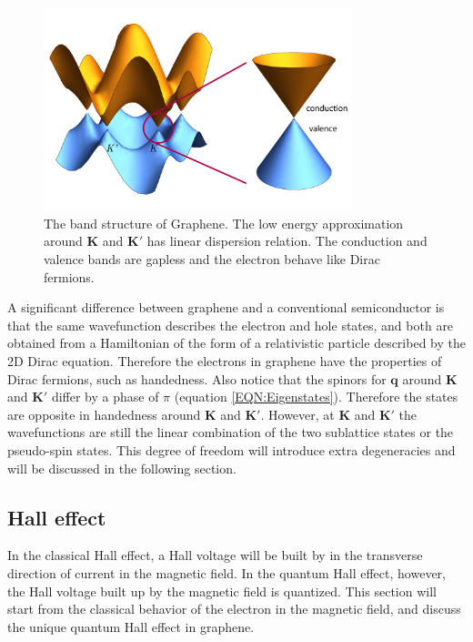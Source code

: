\documentclass[pdflatex, sectionletters, 12pt, final, phd]{pittetd}    %
\begin{document}
\begin{figure}[h!]
	\centering
	\includegraphics[width=0.8\textwidth]{Drawing/GrapheneBandStructure_zoomin.png}
	\caption[The band structure of Graphene]{The band structure of Graphene. The low energy approximation around $\mathbf{K}$ and $\mathbf{K'}$ has linear dispersion relation. The conduction and valence bands are gapless and the electron behave like Dirac fermions.}
	\label{FIG:GrapheneBand}
\end{figure}

A significant difference between graphene and a conventional semiconductor is that the same wavefunction describes the electron and hole states, and both are obtained from a Hamiltonian of the form of a relativistic particle described by the 2D Dirac equation\cite{neto2009electronic}. Therefore the electrons in graphene have the properties of Dirac fermions, such as handedness. Also notice that the spinors for $\mathbf{q}$ around $\mathbf{K}$ and $\mathbf{K'}$ differ by a phase of $\pi$ (equation \ref{EQN:Eigenstates}). Therefore the states are opposite in handedness around $\mathbf{K}$ and $\mathbf{K'}$. However, at $\mathbf{K}$ and $\mathbf{K'}$ the wavefunctions are still the linear combination of the two sublattice states or the pseudo-spin states. This degree of freedom will introduce extra degeneracies and will be discussed in the following section.

\subsection{Hall effect}

In the classical Hall effect, a Hall voltage will be built by in the transverse direction of current in the magnetic field. In the quantum Hall effect, however, the Hall voltage built up by the magnetic field is quantized. This section will start from the classical behavior of the electron in the magnetic field, and discuss the unique quantum Hall effect in graphene.
\end{document}
